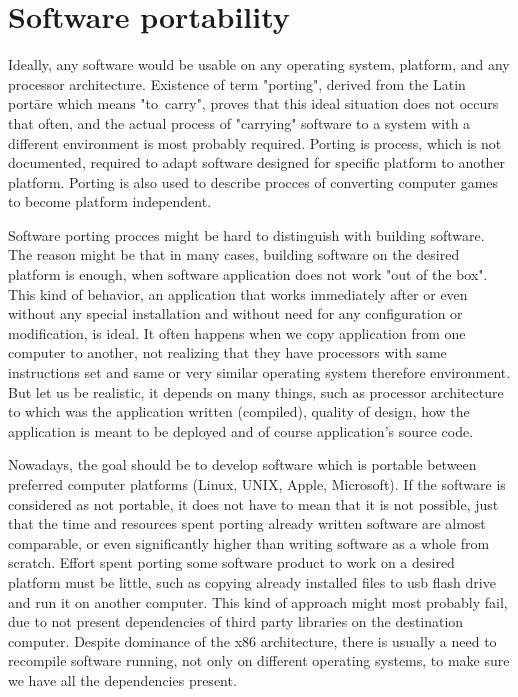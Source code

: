 \chapter{Software portability}\label{porting}

Ideally, any software would be usable on any operating system, platform, and any processor architecture.
Existence of term "porting", derived from the Latin portāre which means "to~carry", proves that this ideal situation does not occurs that often, and the actual process of "carrying" software to a system with a different environment is most probably required.
Porting is process, which is not documented, required to adapt software designed for specific platform to another platform. %
Porting is also used to describe procces of converting computer games to become platform independent\cite{wiki_porting}.

Software porting procces might be hard to distinguish with building software.
The reason might be that in many cases, building software on the desired platform is enough, when software application does not work "out of the box".
This kind of behavior, an application that works immediately after or even without any special installation and without need for any configuration or modification, is ideal.
It often happens when we copy application from one computer to another, not realizing that they have processors with same instructions set and same or very similar operating system therefore environment. %
But let us be realistic, it depends on many things, such as processor architecture to which was the application written (compiled), quality of design, how the application is meant to be deployed and of course application's source code.

Nowadays, the goal should be to develop software which is portable between preferred computer platforms (Linux, UNIX, Apple, Microsoft).
If the software is considered as not portable, it does not have to mean that it is not possible, just that the time and resources spent porting already written software are almost comparable, or even significantly higher than writing software as a whole from scratch. %
Effort spent porting some software product to work on a desired platform must be little, such as copying already installed files to usb flash drive and run it on another computer.
This kind of approach might most probably fail, due to not present dependencies of third party libraries on the destination computer.
Despite dominance of the x86 architecture, there is usually a need to recompile software running, not only on different operating systems, to make sure we have all the dependencies present.


